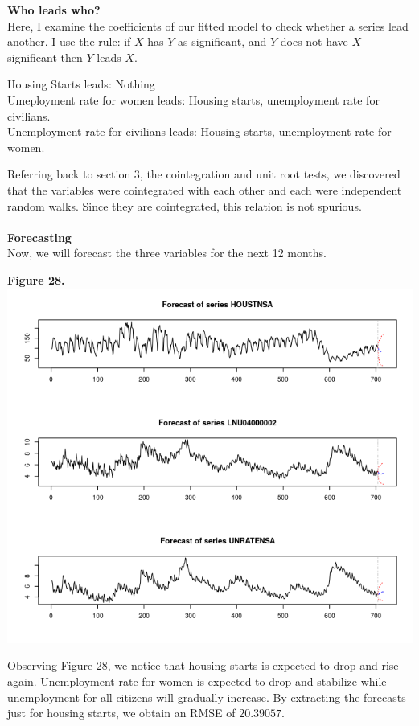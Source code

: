 \documentclass[11pt]{article}
\begin{document}
\textbf{Who leads who?}
\\
Here, I examine the coefficients of our fitted model to check whether a series lead another. I use the rule: if $X$ has $Y$ as significant, and $Y$ does not have $X$ significant then $Y$ leads $X$.
\begin{center}
Housing Starts leads: Nothing\\
Umeployment rate for women leads: Housing starts, unemployment rate for civilians.\\
Unemployment rate for civilians leads: Housing starts, unemployment rate for women.
\end{center}
Referring back to section 3, the cointegration and unit root tests, we discovered that the variables were cointegrated with each other and each were independent random walks. Since they are cointegrated, this relation is not spurious.
\\\\
\textbf{Forecasting}
\\
Now, we will forecast the three variables for the next 12 months.
\begin{center}
\textbf{Figure 28.}
\\
\includegraphics[scale=1]{varFor}
\end{center}
Observing Figure 28, we notice that housing starts is expected to drop and rise again. Unemployment rate for women is expected to drop and stabilize while unemployment for all citizens will gradually increase. By extracting the forecasts just for housing starts, we obtain an RMSE of $20.39057$.
\end{document}
